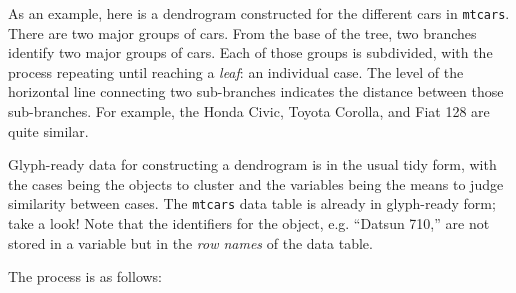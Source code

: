 \documentclass[]{tufte-handout}
\begin{document}
As an example, here is a dendrogram constructed for the different cars
in \texttt{mtcars}. There are two major groups of cars. From the base of
the tree, two branches identify two major groups of cars. Each of those
groups is subdivided, with the process repeating until reaching a
\emph{leaf}: an individual case. The level of the horizontal line
connecting two sub-branches indicates the distance between those
sub-branches. For example, the Honda Civic, Toyota Corolla, and Fiat 128
are quite similar.

Glyph-ready data for constructing a dendrogram is in the usual tidy
form, with the cases being the objects to cluster and the variables
being the means to judge similarity between cases. The \texttt{mtcars}
data table is already in glyph-ready form; take a look! Note that the
identifiers for the object, e.g. ``Datsun 710,'' are not stored in a
variable but in the \emph{row names} of the data table.

 

The process is as follows:

\enlargethispage{1.5in}
\end{document}
